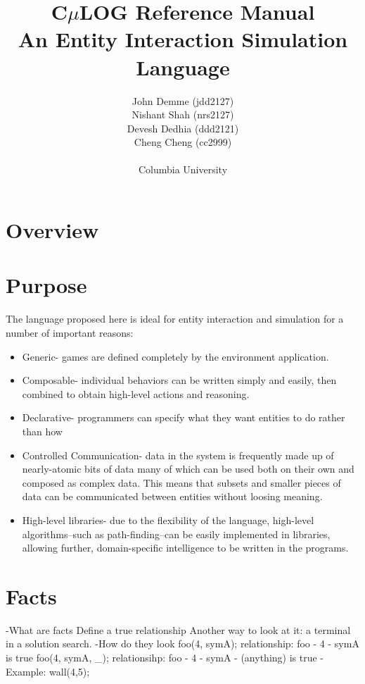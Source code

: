 \documentclass[onecolumn,titlepage]{article}
\begin{document}
\title{C$\mu$LOG Reference Manual\\\small{An Entity Interaction Simulation Language}}
\author{John Demme (jdd2127)\\Nishant Shah (nrs2127)\\Devesh Dedhia (ddd2121)\\Cheng Cheng (cc2999)
\\ \\Columbia University}

\maketitle

\section{Overview}

\section{Purpose}
The language proposed here is ideal for entity interaction and simulation for a 
number of important reasons:
\begin{itemize}
\item Generic- games are defined completely by the environment application.

\item Composable- individual behaviors can be written simply and easily, then combined
  to obtain high-level actions and reasoning.

\item Declarative- programmers can specify what they want entities to do rather than how

\item Controlled Communication- data in the system is frequently made up of nearly-atomic bits of data
  many of which can be used both on their own and composed as complex data.  This means that subsets
  and smaller pieces of data can be communicated between entities without loosing meaning.

\item High-level libraries- due to the flexibility of the language, high-level
  algorithms--such as path-finding--can be easily implemented in libraries, allowing
  further, domain-specific intelligence to be written in the programs.
\end{itemize}

\section{Facts}
-What are facts
   Define a true relationship
   Another way to look at it: a terminal in a solution search.
-How do they look
   foo(4, symA);
     relationship: foo - 4 - symA  is true
   foo(4, symA, _);
     relationsihp: foo - 4 - symA - (anything)  is true
-Example: wall(4,5);
\end{document}
